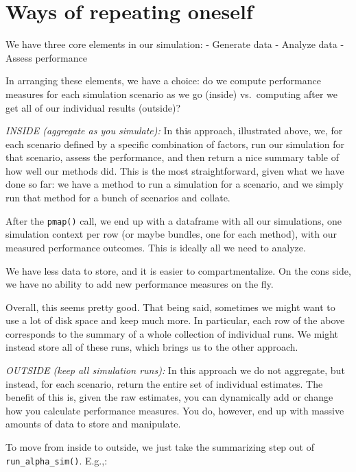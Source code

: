 \documentclass[
]{book}
\begin{document}
\section{Ways of repeating oneself}\label{ways-of-repeating-oneself}

We have three core elements in our simulation:
- Generate data
- Analyze data
- Assess performance

In arranging these elements, we have a choice: do we compute performance measures for each simulation scenario as we go (inside) vs.~computing after we get all of our individual results (outside)?

\emph{INSIDE (aggregate as you simulate):}
In this approach, illustrated above, we, for each scenario defined by a specific combination of factors, run our simulation for that scenario, assess the performance, and then return a nice summary table of how well our methods did.
This is the most straightforward, given what we have done so far: we have a method to run a simulation for a scenario, and we simply run that method for a bunch of scenarios and collate.

After the \texttt{pmap()} call, we end up with a dataframe with all our simulations, one simulation context per row (or maybe bundles, one for each method), with
our measured performance outcomes. This is ideally all we need to analyze.

We have less data to store, and it is easier to compartmentalize.
On the cons side, we have no ability to add new performance measures on the fly.

Overall, this seems pretty good.
That being said, sometimes we might want to use a lot of disk space and keep
much more. In particular, each row of the above corresponds to the summary
of a whole collection of individual runs. We might instead store all of
these runs, which brings us to the other approach.

\emph{OUTSIDE (keep all simulation runs):}
In this approach we do not aggregate, but instead, for each scenario, return the entire set of individual estimates.
The benefit of this is, given the raw estimates, you can dynamically add or change how you calculate performance measures.
You do, however, end up with massive amounts of data to store and manipulate.

To move from inside to outside, we just take the summarizing step out of \texttt{run\_alpha\_sim()}.
E.g.,:
\end{document}
